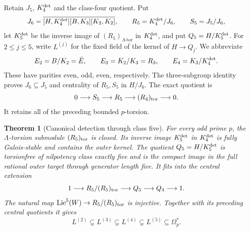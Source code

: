 \documentclass[11pt]{article}
\newtheorem{theorem}{Theorem}[section]
\theoremstyle{definition}\newtheorem{definition}[theorem]{Definition}
\begin{document}
Retain $J_5$, $K_4^{\rm det}$ and the class-four quotient.
Put
\[
 J_6=\overline{[H,K_4^{\rm det}][B,K_3][K_2,K_2]},
 \qquad R_5=K_4^{\rm det}/J_6,
 \qquad S_5=J_5/J_6,
\]
let \(K_5^{\rm det}\) be the inverse image of \((R_5)_{\Lambda\text{-tor}}\) in \(K_4^{\rm det}\), and put \(Q_5=H/K_5^{\rm det}\). For \(2\leq j\leq5\), write \(L^{(j)}\) for the fixed field of the kernel of \(H\to Q_j\). We abbreviate
\[
 E_2=B/K_2=\bar E,
 \qquad E_3=K_2/K_3=R_3,
 \qquad E_4=K_3/K_4^{\rm det}.
\]
These have parities even, odd, even, respectively.
The three-subgroup identity proves $J_6\subseteq J_5$
and centrality of $R_5,S_5$ in $H/J_6$. The exact
quotient is
\begin{equation}\label{eq:class5-old-torsion}
 0\longrightarrow S_5\longrightarrow R_5
                  \longrightarrow(R_4)_{\rm tor}\longrightarrow0.
\end{equation}
It retains all of the preceding bounded $p$-torsion.



\begin{theorem}[Canonical detection through class five]\label{thm:canonical-class-five}
For every odd prime $p$, the $\Lambda$-torsion submodule
$(R_5)_{\rm tor}$ is closed. Its inverse image
$K_5^{\rm det}$ in $K_4^{\rm det}$ is fully
Galois-stable and contains the outer kernel.
The quotient $Q_5=H/K_5^{\rm det}$ is torsionfree of
nilpotency class exactly five and is the compact
image in the full rational outer target through
generator length five. It fits into the central
extension
\[
 1\longrightarrow R_5/(R_5)_{\rm tor}
 \longrightarrow Q_5\longrightarrow Q_4\longrightarrow1.
\]
The natural map
$\operatorname{Lie}^5(W)\to R_5/(R_5)_{\rm tor}$ is injective.
Together with its preceding central quotients it gives
\[
 L^{(2)}\subsetneq L^{(3)}\subsetneq L^{(4)}
                         \subsetneq L^{(5)}\subseteq\Omega_p^*.
\]
\end{theorem}
\end{document}
